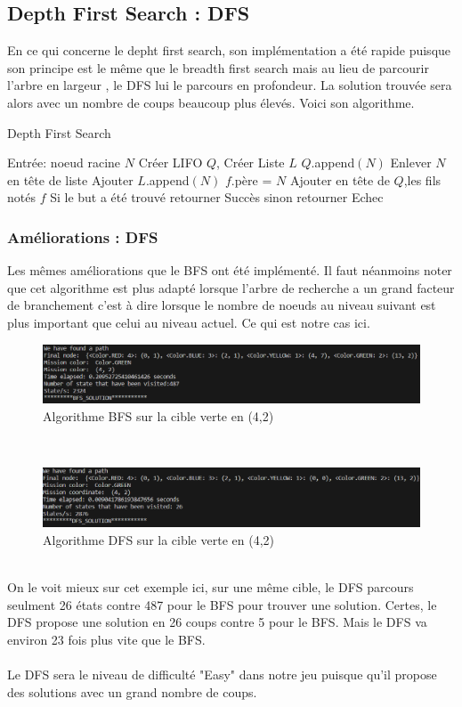 \documentclass{article}
\begin{document}
\subsection{Depth First Search : DFS}
En ce qui concerne le depht first search, son implémentation a été rapide puisque son principe est le même que le breadth first search mais au lieu de parcourir l'arbre en largeur , le DFS lui le parcours en profondeur. La solution trouvée sera alors avec un nombre de coups beaucoup plus élevés. Voici son algorithme.
\begin{algorithm}[H]
\caption{Depth First Search}
\label{alg:dfs-reach}
\begin{algorithmic}[2]
  \STATE Entrée: noeud racine $N$
  \STATE Créer LIFO $Q$, Créer Liste $L$
  \STATE $Q$.append$(N)$
    \STATE Enlever $N$ en tête de liste
    \STATE Ajouter $L$.append$(N)$
      \STATE $f$.père = $N$
      \STATE Ajouter en tête de $Q$,les fils notés $f$
    \ENDFOR
  \ENDWHILE
  \STATE Si le but a été trouvé retourner Succès sinon retourner Echec
\end{algorithmic}
\end{algorithm}
\subsubsection{Améliorations : DFS}
Les mêmes améliorations que le BFS ont été implémenté. Il faut néanmoins noter que cet algorithme est plus adapté lorsque l'arbre de recherche a un grand facteur de branchement c'est à dire lorsque le nombre de noeuds au niveau suivant est plus important que celui au niveau actuel. Ce qui est notre cas ici.
\begin{figure}[!h]
  \centering  
  \includegraphics[width=1\textwidth]{bfs_solution_green.png}  
  \caption{Algorithme BFS sur la cible verte en (4,2)} 
  \label{fig:Diagram}  
\end{figure}\\
\begin{figure}[!h]
  \centering  
  \includegraphics[width=1\textwidth]{dfs_solution_green.png}  
  \caption{Algorithme DFS sur la cible verte en (4,2)} 
  \label{fig:Diagram}  
\end{figure}\\
On le voit mieux sur cet exemple ici, sur une même cible, le DFS parcours seulment 26 états contre 487 pour le BFS pour trouver une solution. Certes, le DFS propose une solution en 26 coups contre 5 pour le BFS. Mais le DFS va environ 23 fois plus vite que le BFS.\\\\
Le DFS sera le niveau de difficulté "Easy" dans notre jeu puisque qu'il propose des solutions avec un grand nombre de coups.
\end{document}
